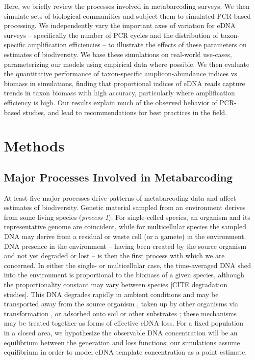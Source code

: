 \documentclass[fleqn,11pt,lineno]{wlscirep}
\begin{document}
Here, we briefly review the processes involved in metabarcoding surveys. We then simulate sets of biological communities and subject them to simulated PCR-based processing. We independently vary the important axes of variation for eDNA surveys -- specifically the number of PCR cycles and the distribution of taxon-specific amplification efficiencies -- to illustrate the effects of these parameters on estimates of biodiversity. We base these simulations on real-world use-cases, parameterizing our models using empirical data where possible. We then evaluate the quantitative performance of taxon-specific amplicon-abundance indices vs. biomass in simulations, finding that proportional indices of eDNA reads capture trends in taxon biomass with high accuracy, particularly where amplification efficiency is high. Our results explain much of the observed behavior of PCR-based studies, and lead to recommendations for best practices in the field.


\vspace{2em}

\section{Methods}\label{methods}

\subsection*{Major Processes Involved in Metabarcoding}

At least five major processes drive patterns of metabarcoding data and affect estimates of biodiversity. Genetic material sampled from an environment derives from some living species (\textit{process 1}). For single-celled species, an organism and its representative genome are coincident, while for multicellular species the sampled DNA may derive from a residual or waste cell (or a gamete) in the environment.  DNA presence in the environment -- having been created by the source organism and not yet degraded or lost -- is then the first process with which we are concerned. In either the single- or multicellular case, the time-averaged DNA shed into the environment is proportional to the biomass of a given species, although the proportionality constant may vary between species [CITE degradation studies]. This DNA degrades rapidly in ambient conditions \cite{thomsen_detection_2012-1, sassoubre2016quantification} and may be transported away from the source organism \cite{deiner_transport_2014-1, wilcox2016understanding}, taken up by other organisms via transformation \cite{chen2004dna}, or adsorbed onto soil or other substrates \cite{lorenz1987adsorption}; these mechanisms may be treated together as forms of effective eDNA loss. For a fixed population in a closed area, we hypothesize the observable DNA concentration will be an equilibrium between the generation and loss functions; our simulations assume equilibrium in order to model eDNA template concentration as a point estimate. 
\end{document}
